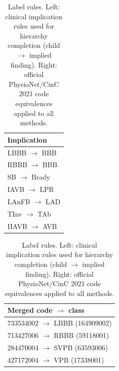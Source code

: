 \begin{table}[h]\centering\footnotesize
\caption{Label rules. Left: clinical implication rules used for hierarchy completion (child $\rightarrow$ implied finding). Right: official PhysioNet/CinC 2021 code equivalences applied to all methods.}\label{tab:rules}
\begin{tabular}{@{}l@{}}\toprule Implication \\ \midrule
LBBB $\rightarrow$ BBB \\
RBBB $\rightarrow$ BBB \\
SB $\rightarrow$ Brady \\
IAVB $\rightarrow$ LPR \\
LAnFB $\rightarrow$ LAD \\
TInv $\rightarrow$ TAb \\
IIAVB $\rightarrow$ AVB \\
\bottomrule\end{tabular}\qquad
\begin{tabular}{@{}l@{}}\toprule Merged code $\rightarrow$ class \\ \midrule
733534002 $\rightarrow$ LBBB (164909002) \\
713427006 $\rightarrow$ RBBB (59118001) \\
284470004 $\rightarrow$ SVPB (63593006) \\
427172004 $\rightarrow$ VPB (17338001) \\
\bottomrule\end{tabular}
\end{table}
